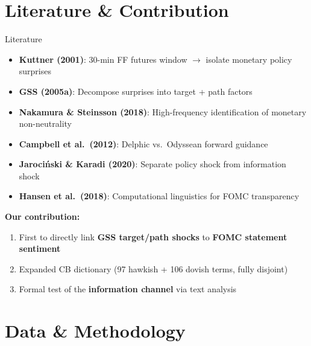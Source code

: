 \documentclass[aspectratio=169, 11pt]{beamer}
\begin{document}
\section{Literature \& Contribution}

\begin{frame}{Literature}
\begin{itemize}
  \item \textbf{Kuttner (2001)}: 30-min FF futures window $\rightarrow$ isolate monetary policy surprises
  \item \textbf{GSS (2005a)}: Decompose surprises into \textcolor{accent}{target} + \textcolor{alertc}{path} factors
  \item \textbf{Nakamura \& Steinsson (2018)}: High-frequency identification of monetary non-neutrality
  \item \textbf{Campbell et al.\ (2012)}: Delphic vs.\ Odyssean forward guidance
  \item \textbf{Jaroci\'{n}ski \& Karadi (2020)}: Separate policy shock from information shock
  \item \textbf{Hansen et al.\ (2018)}: Computational linguistics for FOMC transparency
\end{itemize}

\vspace{0.8em}
\textbf{Our contribution:}
\begin{enumerate}
  \item First to directly link \textbf{GSS target/path shocks} to \textbf{FOMC statement sentiment}
  \item Expanded CB dictionary (97 hawkish + 106 dovish terms, fully disjoint)
  \item Formal test of the \textbf{information channel} via text analysis
\end{enumerate}
\end{frame}

\section{Data \& Methodology}
\end{document}
